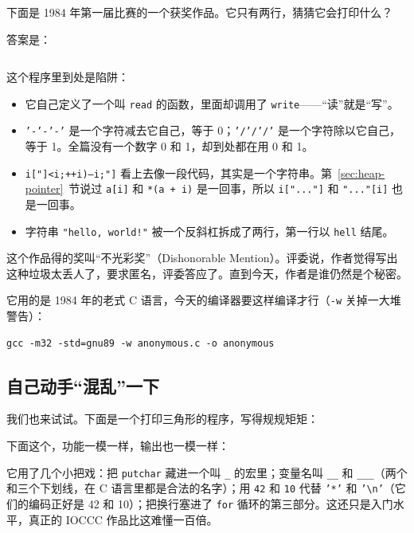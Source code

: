 下面是 1984 年第一届比赛的一个获奖作品。它只有两行，猜猜它会打印什么？


答案是：
\inputminted[linenos=false]{text}{code/appc/out/anonymous.txt}

这个程序里到处是陷阱：
\begin{itemize}
  \item 它自己定义了一个叫 \texttt{read} 的函数，里面却调用了 \texttt{write}——“读”就是“写”。
  \item \texttt{'-'-'-'} 是一个字符减去它自己，等于 0；\texttt{'/'/'/'} 是一个字符除以它自己，等于 1。全篇没有一个数字 0 和 1，却到处都在用 0 和 1。
  \item \texttt{i["]<i;++i){--i;}"]} 看上去像一段代码，其实是一个字符串。第~\ref{sec:heap-pointer}~节说过 \texttt{a[i]} 和 \texttt{*(a + i)} 是一回事，所以 \texttt{i["..."]} 和 \texttt{"..."[i]} 也是一回事。
  \item 字符串 \texttt{"hello, world!"} 被一个反斜杠拆成了两行，第一行以 \texttt{hell} 结尾。
\end{itemize}

这个作品得的奖叫“不光彩奖”（Dishonorable Mention）。评委说，作者觉得写出这种垃圾太丢人了，要求匿名，评委答应了。直到今天，作者是谁仍然是个秘密。

它用的是 1984 年的老式 C 语言，今天的编译器要这样编译才行（\texttt{-w} 关掉一大堆警告）：
\begin{verbatim}
gcc -m32 -std=gnu89 -w anonymous.c -o anonymous
\end{verbatim}

\subsection{自己动手“混乱”一下}

我们也来试试。下面是一个打印三角形的程序，写得规规矩矩：


下面这个，功能一模一样，输出也一模一样：


它用了几个小把戏：把 \texttt{putchar} 藏进一个叫 \texttt{\_} 的宏里；变量名叫 \texttt{\_\_} 和 \texttt{\_\_\_}（两个和三个下划线，在 C 语言里都是合法的名字）；用 \texttt{42} 和 \texttt{10} 代替 \texttt{'*'} 和 \texttt{'\textbackslash n'}（它们的编码正好是 42 和 10）；把换行塞进了 \texttt{for} 循环的第三部分。这还只是入门水平，真正的 IOCCC 作品比这难懂一百倍。


